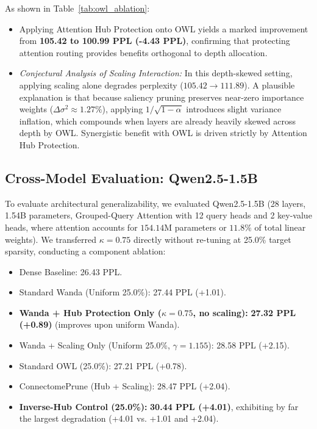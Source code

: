 \documentclass{article}
\begin{document}
As shown in Table~\ref{tab:owl_ablation}:
\begin{itemize}
    \item Applying Attention Hub Protection onto OWL yields a marked improvement from \textbf{105.42 to 100.99 PPL (-4.43 PPL)}, confirming that protecting attention routing provides benefits orthogonal to depth allocation.
    \item \textit{Conjectural Analysis of Scaling Interaction:} In this depth-skewed setting, applying scaling alone degrades perplexity ($105.42 \to 111.89$). A plausible explanation is that because saliency pruning preserves near-zero importance weights ($\Delta \sigma^2 \approx 1.27\%$), applying $1/\sqrt{1 - \alpha}$ introduces slight variance inflation, which compounds when layers are already heavily skewed across depth by OWL. Synergistic benefit with OWL is driven strictly by Attention Hub Protection.
\end{itemize}

\subsection{Cross-Model Evaluation: Qwen2.5-1.5B}
To evaluate architectural generalizability, we evaluated Qwen2.5-1.5B (28 layers, 1.54B parameters, Grouped-Query Attention with 12 query heads and 2 key-value heads, where attention accounts for $154.14\text{M}$ parameters or $11.8\%$ of total linear weights). We transferred $\kappa = 0.75$ directly without re-tuning at 25.0\% target sparsity, conducting a component ablation:
\begin{itemize}
    \item Dense Baseline: 26.43 PPL.
    \item Standard Wanda (Uniform 25.0\%): 27.44 PPL (+1.01).
    \item \textbf{Wanda + Hub Protection Only ($\kappa=0.75$, no scaling):} \textbf{27.32 PPL (+0.89)} (improves upon uniform Wanda).
    \item Wanda + Scaling Only (Uniform 25.0\%, $\gamma=1.155$): 28.58 PPL (+2.15).
    \item Standard OWL (25.0\%): 27.21 PPL (+0.78).
    \item ConnectomePrune (Hub + Scaling): 28.47 PPL (+2.04).
    \item \textbf{Inverse-Hub Control (25.0\%):} \textbf{30.44 PPL (+4.01)}, exhibiting by far the largest degradation (+4.01 vs. +1.01 and +2.04).
\end{itemize}
\end{document}
